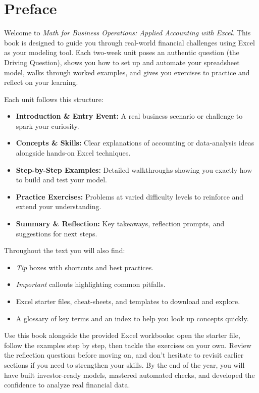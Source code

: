 \cleardoublepage
\chapter*{Preface}

Welcome to \emph{Math for Business Operations: Applied Accounting with Excel}.  This book is designed to guide you through real-world financial challenges using Excel as your modeling tool.  Each two-week unit poses an authentic question (the Driving Question), shows you how to set up and automate your spreadsheet model, walks through worked examples, and gives you exercises to practice and reflect on your learning.

\medskip
Each unit follows this structure:
\begin{itemize}
  \item \textbf{Introduction \& Entry Event:} A real business scenario or challenge to spark your curiosity.
  \item \textbf{Concepts \& Skills:} Clear explanations of accounting or data-analysis ideas alongside hands-on Excel techniques.
  \item \textbf{Step-by-Step Examples:} Detailed walkthroughs showing you exactly how to build and test your model.
  \item \textbf{Practice Exercises:} Problems at varied difficulty levels to reinforce and extend your understanding.
  \item \textbf{Summary \& Reflection:} Key takeaways, reflection prompts, and suggestions for next steps.
\end{itemize}

Throughout the text you will also find:
\begin{itemize}
  \item \emph{Tip} boxes with shortcuts and best practices.
  \item \emph{Important} callouts highlighting common pitfalls.
  \item Excel starter files, cheat-sheets, and templates to download and explore.
  \item A glossary of key terms and an index to help you look up concepts quickly.
\end{itemize}

Use this book alongside the provided Excel workbooks: open the starter file, follow the examples step by step, then tackle the exercises on your own.  Review the reflection questions before moving on, and don’t hesitate to revisit earlier sections if you need to strengthen your skills.  By the end of the year, you will have built investor-ready models, mastered automated checks, and developed the confidence to analyze real financial data.

\clearpage
